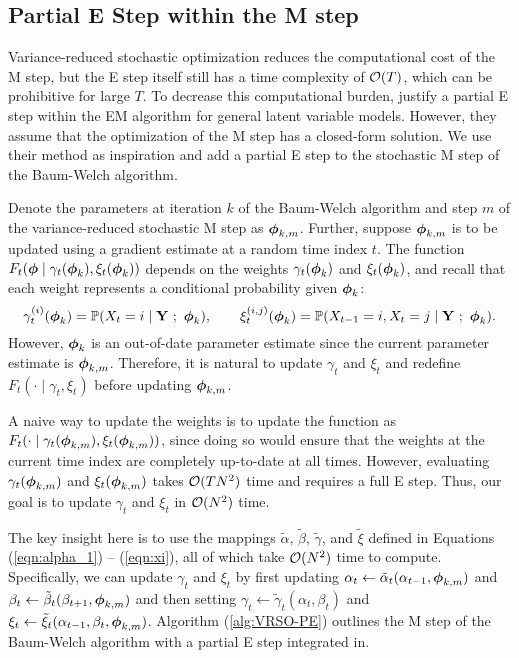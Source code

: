 \subsection{Partial E Step within the M step}
\label{subsec:stoch_E}

Variance-reduced stochastic optimization reduces the computational cost of the M step, but the E step itself still has a time complexity of $\mathcal{O}(T)$, which can be prohibitive for large $T$. To decrease this computational burden, \citet{Neal:1998} justify a partial E step within the EM algorithm for general latent variable models. However, they assume that the optimization of the M step has a closed-form solution. We use their method as inspiration and add a partial E step to the stochastic M step of the Baum-Welch algorithm. 

Denote the parameters at iteration $k$ of the Baum-Welch algorithm and step $m$ of the variance-reduced stochastic M step as $\boldsymbol{\phi}_{k,m}$. Further, suppose $\boldsymbol{\phi}_{k,m}$ is to be updated using a gradient estimate at a random time index $t$. The function $F_{t}(\boldsymbol{\phi} \mid \gamma_{t}(\boldsymbol{\phi}_{k}), \xi_{t}(\boldsymbol{\phi}_{k}))$ depends on the weights $\gamma_{t}(\boldsymbol{\phi}_{k})$ and $\xi_{t}(\boldsymbol{\phi}_{k})$, and recall that each weight represents a conditional probability given $\boldsymbol{\phi}_{k}$:
%
\begin{equation}
    \gamma_{t}^{(i)}(\boldsymbol{\phi}_{k}) = \mathbb{P}(X_{t} = i \mid \mathbf{Y} ~;~ \boldsymbol{\phi}_k), \qquad \xi_{t}^{(i,j)}(\boldsymbol{\phi}_{k}) = \mathbb{P}(X_{t-1} = i, X_{t} = j \mid \mathbf{Y} ~;~ \boldsymbol{\phi}_k).
\end{equation}
%
However, $\boldsymbol{\phi}_{k}$ is an out-of-date parameter estimate since the current parameter estimate is $\boldsymbol{\phi}_{k,m}$. Therefore, it is natural to update $\gamma_{t}$ and $\xi_{t}$ and redefine $F_{t}(\cdot \mid \gamma_{t}, \xi_{t})$ before updating $\boldsymbol{\phi}_{k,m}$. 

A naive way to update the weights is to update the function as $F_{t}(\cdot \mid \gamma_{t}(\boldsymbol{\phi}_{k,m}), \xi_{t}(\boldsymbol{\phi}_{k,m}))$, since doing so would ensure that the weights at the current time index are completely up-to-date at all times. However, evaluating $\gamma_{t}(\boldsymbol{\phi}_{k,m})$ and $\xi_{t}(\boldsymbol{\phi}_{k,m})$ takes $\mathcal{O}(TN^2)$ time and requires a full E step. Thus, our goal is to update $\gamma_{t}$ and $\xi_{t}$ in $\mathcal{O}(N^2)$ time.

The key insight here is to use the mappings $\tilde \alpha$, $\tilde \beta$, $\tilde \gamma$, and $\tilde \xi$ defined in Equations (\ref{eqn:alpha_1}) -- (\ref{eqn:xi}), all of which take $\mathcal{O}(N^2)$ time to compute. Specifically, we can update $\gamma_{t}$ and $\xi_{t}$ by first updating $\alpha_{t} \gets \tilde \alpha_{t}(\alpha_{t-1},\boldsymbol{\phi}_{k,m})$ and $\beta_{t} \gets \tilde \beta_{t}(\beta_{t+1},\boldsymbol{\phi}_{k,m})$ and then setting $\gamma_{t} \gets \tilde \gamma_{t}(\alpha_{t},\beta_{t})$ and $\xi_{t} \gets \tilde \xi_{t}(\alpha_{t-1},\beta_{t},\boldsymbol{\phi}_{k,m})$. Algorithm (\ref{alg:VRSO-PE}) outlines the M step of the Baum-Welch algorithm with a partial E step integrated in.

